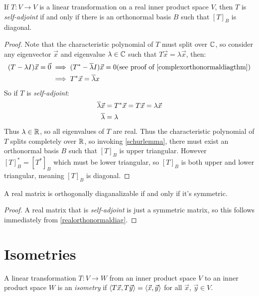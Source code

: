 \begin{theorem}\label{realorthonormaldiag}
  If $T : V \to V$ is a linear transformation on a real inner product space $V$,
  then $T$ is \emph{self-adjoint} if and only if there is an orthonormal basis $B$
  such that $[T]_B$ is diagonal.
\end{theorem}
\begin{proof}
  Note that the characteristic polynomial of $T$ must split over $\mathbb{C}$, so consider any eigenvector $\vec x$ and eigenvalue $\lambda \in \mathbb{C}$ such that
  $T \vec x = \lambda \vec x$, then:
  \begin{align}
    (T-\lambda I)\vec x = \vec 0
    &\implies (T^*-\overline{\lambda} I) \vec x = 0 \text{(see proof of \ref{complexorthonormaldiagthm})} \\
    &\implies T^*\vec x = \overline{\lambda} x
  \end{align}
  So if $T$ is \emph{self-adjoint}:
    \begin{align}
      \overline{\lambda} \vec x &= T^*\vec x = T\vec x = \lambda \vec x \\
      \overline{\lambda} &= \lambda
    \end{align}
  Thus $\lambda \in \mathbb{R}$, so all eigenvalues of $T$ are real.
  Thus the characteristic polynomial of $T$ splits completely over $\mathbb{R}$, so invoking \ref{schurlemma},
  there must exist an orthonormal basis $B$ such that $[T]_B$ is upper triangular.
  However $[T]^*_B = [T^*]_B$ which must be lower triangular, so $[T]_B$ is both upper and lower triangular,
  meaning $[T]_B$ is diagonal.
\end{proof}

\begin{corollary}
  A real matrix is orthogonally diaganalizable if and only if it's symmetric.
\end{corollary}
\begin{proof}
  A real matrix that is \emph{self-adjoint} is just a symmetric matrix, so this follows immediately from \ref{realorthonormaldiag}.
\end{proof}

\section{Isometries}

\begin{definition}
  A linear transformation $T : V \to W$ from an inner product space $V$ to an inner product space $W$ is an \emph{isometry}
  if $\left\langle T \vec x , T \vec y \right\rangle = \left\langle \vec x , \vec y \right\rangle$ for all $\vec x$, $\vec y \in V$.
\end{definition}

